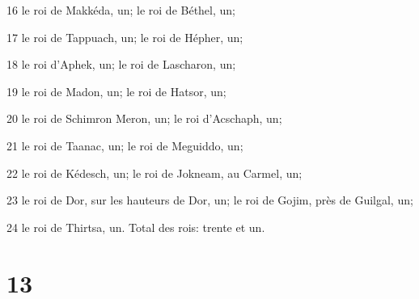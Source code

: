 \par 16 le roi de Makkéda, un; le roi de Béthel, un;
\par 17 le roi de Tappuach, un; le roi de Hépher, un;
\par 18 le roi d'Aphek, un; le roi de Lascharon, un;
\par 19 le roi de Madon, un; le roi de Hatsor, un;
\par 20 le roi de Schimron Meron, un; le roi d'Acschaph, un;
\par 21 le roi de Taanac, un; le roi de Meguiddo, un;
\par 22 le roi de Kédesch, un; le roi de Jokneam, au Carmel, un;
\par 23 le roi de Dor, sur les hauteurs de Dor, un; le roi de Gojim, près de Guilgal, un;
\par 24 le roi de Thirtsa, un. Total des rois: trente et un.

\chapter{13}

